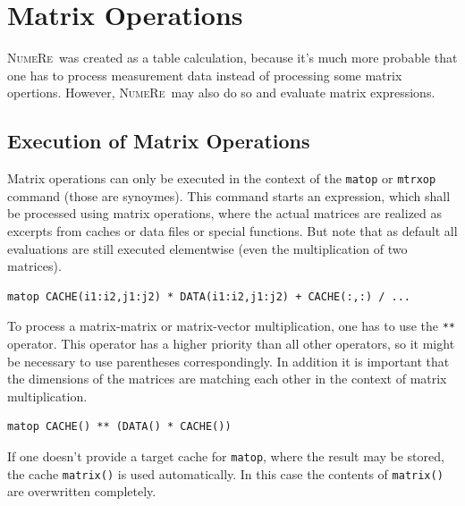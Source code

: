 \documentclass[DIV=14,headsepline,footsepline]{scrbook}
\newcommand{\NR}{\textsc{Nu\-me\-Re}}
\begin{document}
		\chapter{Matrix Operations}
			\NR\ was created as a table calculation, because it's much more probable that one has to process measurement data instead of processing some matrix opertions. However, \NR\ may also do so and evaluate matrix expressions.
			\section{Execution of Matrix Operations}
				Matrix operations can only be executed in the context of the \lstinline+matop+ or \lstinline+mtrxop+ command (those are synoymes). This command starts an expression, which shall be processed using matrix operations, where the actual matrices are realized as excerpts from caches or data files or special functions. But note that as default all evaluations are still executed elementwise (even the multiplication of two matrices).
				\begin{lstlisting}
matop CACHE(i1:i2,j1:j2) * DATA(i1:i2,j1:j2) + CACHE(:,:) / ...
				\end{lstlisting}
				
				To process a matrix-matrix or matrix-vector multiplication, one has to use the \lstinline+**+ operator. This operator has a higher priority than all other operators, so it might be necessary to use parentheses correspondingly. In addition it is important that the dimensions of the matrices are matching each other in the context of matrix multiplication.
				\begin{lstlisting}
matop CACHE() ** (DATA() * CACHE())
				\end{lstlisting}
				
				If one doesn't provide a target cache for \lstinline+matop+, where the result may be stored, the cache \lstinline+matrix()+ is used automatically. In this case the contents of \lstinline+matrix()+ are overwritten completely.
				
\end{document}
